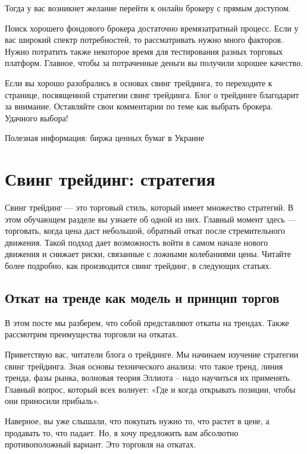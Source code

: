 \documentclass[a5paper]{article}
\begin{document}
Тогда у вас возникнет желание перейти к онлайн брокеру с прямым доступом.

Поиск хорошего фондового брокера достаточно времязатратный процесс. Если у вас широкий спектр потребностей, то рассматривать нужно много факторов. Нужно потратить также некоторое время для тестирования разных торговых платформ. Главное, чтобы за потраченные деньги вы получили хорошее качество.

Если вы хорошо разобрались в основах свинг трейдинга, то переходите к странице, посвященной стратегии свинг трейдинга. Блог о трейдинге благодарит за внимание. Оставляйте свои комментарии по теме как выбрать брокера. Удачного выбора!


Полезная информация: биржа ценных бумаг в Украине


\section{Свинг трейдинг: стратегия}

Свинг трейдинг — это торговый стиль, который имеет множество стратегий. В этом обучающем разделе вы узнаете об одной из них. Главный момент здесь — торговать, когда цена даст небольшой, обратный откат после стремительного движения. Такой подход дает возможность войти в самом начале нового движения и снижает риски, связанные с ложными колебаниями цены. Читайте более подробно, как производится свинг трейдинг, в следующих статьях.

\subsection{Откат на тренде как модель и принцип торгов}

В этом посте мы разберем, что собой представляют откаты на трендах. Также рассмотрим преимущества торговли на откатах.

Приветствую вас, читатели блога о трейдинге. Мы начинаем изучение стратегии свинг трейдинга. Зная основы технического анализа: что такое тренд, линия тренда, фазы рынка, волновая теория Эллиота – надо научиться их применять. Главный вопрос, который всех волнует: «Где и когда открывать позиции, чтобы они приносили прибыль».

Наверное, вы уже слышали, что покупать нужно то, что растет в цене, а
продавать то, что падает. Но, я хочу предложить вам абсолютно
противоположный вариант. Это торговля на откатах.
\end{document}
